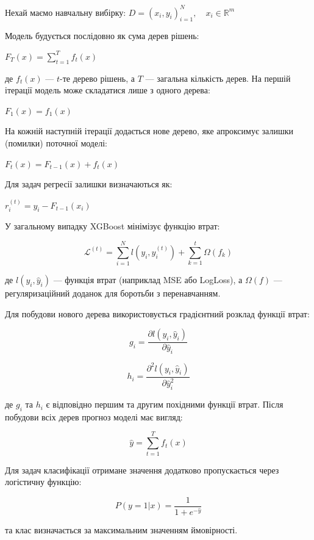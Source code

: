 Нехай маємо навчальну вибірку: $D = {(x_i, y_i)}_{i=1}^{N}, \quad x_i \in \mathbb{R}^m$

Модель будується послідовно як сума дерев рішень:

$F_T(x) = \sum_{t=1}^{T} f_t(x)$

де $f_t(x)$ — $t$-те дерево рішень, а $T$ — загальна кількість дерев. На першій ітерації модель може складатися лише з одного дерева:

$F_1(x) = f_1(x)$

На кожній наступній ітерації додається нове дерево, яке апроксимує залишки (помилки) поточної моделі:

$F_t(x) = F_{t-1}(x) + f_t(x)$

Для задач регресії залишки визначаються як:

$r_i^{(t)} = y_i - F_{t-1}(x_i)$

У загальному випадку XGBoost мінімізує функцію втрат:

$$
\mathcal{L}^{(t)}
=
\sum_{i=1}^{N}
l(y_i,\hat y_i^{(t)})
+
\sum_{k=1}^{t}
\Omega(f_k)
$$

де $l(y_i,\hat y_i)$ — функція втрат (наприклад MSE або LogLoss), а $\Omega(f)$ — регуляризаційний доданок для боротьби з перенавчанням.

Для побудови нового дерева використовується градієнтний розклад функції втрат:

$$
g_i =
\frac{\partial l(y_i,\hat y_i)}
{\partial \hat y_i}
$$

$$
h_i =
\frac{\partial^2 l(y_i,\hat y_i)}
{\partial \hat y_i^2}
$$

де $g_i$ та $h_i$ є відповідно першим та другим похідними функції втрат. Після побудови всіх дерев прогноз моделі має вигляд:

$$
\hat y =
\sum_{t=1}^{T}
f_t(x)
$$

Для задач класифікації отримане значення додатково пропускається через логістичну функцію:

$$
P(y=1|x)
=
\frac{1}
{1+e^{-\hat y}}
$$

та клас визначається за максимальним значенням ймовірності.

